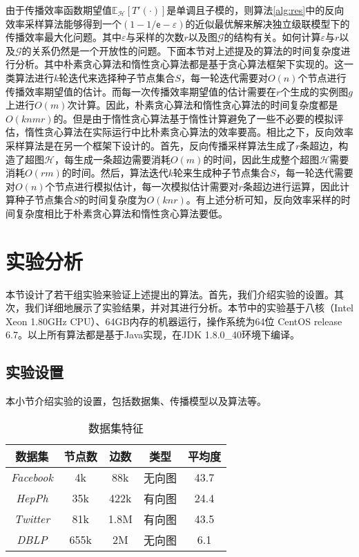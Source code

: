 由于传播效率函数期望值$\mathbb{E}_\mathcal{H}\left[T'\left(\cdot\right)\right]$是单调且子模的，则算法\ref{alg:res}中的反向效率采样算法能够得到一个$\left(1-1/\mathsf{e}-\varepsilon\right)$的近似最优解来解决独立级联模型下的传播效率最大化问题。其中$\varepsilon$与采样的次数$r$以及图$\mathcal{G}$的结构有关。如何计算$\varepsilon$与$r$以及$\mathcal{G}$的关系仍然是一个开放性的问题。下面本节对上述提及的算法的时间复杂度进行分析。其中朴素贪心算法和惰性贪心算法都是基于贪心算法框架下实现的。这一类算法进行$k$轮迭代来选择种子节点集合$S$，每一轮迭代需要对$O\left(n\right)$个节点进行传播效率期望值的估计。而每一次传播效率期望值的估计需要在$r$个生成的实例图$g$上进行$O\left(m\right)$次计算。因此，朴素贪心算法和惰性贪心算法的时间复杂度都是$O\left(knmr\right)$的。但是由于惰性贪心算法基于惰性计算避免了一些不必要的模拟评估，惰性贪心算法在实际运行中比朴素贪心算法的效率要高。相比之下，反向效率采样算法是在另一个框架下设计的。首先，反向传播采样算法生成了$r$条超边，构造了超图$\mathcal{H}$，每生成一条超边需要消耗$O\left(m\right)$的时间，因此生成整个超图$\mathcal{H}$需要消耗$O\left(rm\right)$的时间。然后，算法迭代$k$轮来生成种子节点集合$S$，每一轮迭代需要对$O\left(n\right)$个节点进行模拟估计，每一次模拟估计需要对$r$条超边进行运算，因此计算种子节点集合$S$的时间复杂度为$O\left(knr\right)$。有上述分析可知，反向效率采样的时间复杂度相比于朴素贪心算法和惰性贪心算法要低。

\section{实验分析}
\label{sec4:experiment}
本节设计了若干组实验来验证上述提出的算法。首先，我们介绍实验的设置。其次，我们详细地展示了实验结果，并对其进行分析。本节中的实验基于八核（Intel Xeon 1.80GHz CPU）、64GB内存的机器运行，操作系统为64位 CentOS release 6.7。以上所有算法都是基于Java实现，在JDK 1.8.0\_40环境下编译。
\subsection{实验设置}
\label{subsec4:settings}
本小节介绍实验的设置，包括数据集、传播模型以及算法等。
\begin{table}[!ht]
\centering
\caption{数据集特征}
\label{tab:dataset}
\begin{tabular}{ |c|c|c|c|c| }
\hline
\textbf{数据集} & \textbf{节点数} & \textbf{边数} & \textbf{类型} & \textbf{平均度} \\
\hline
\textit{Facebook} & 4k & 88k & 无向图 & 43.7\\
\hline
\textit{HepPh} & 35k & 422k & 有向图 & 24.4\\
\hline
\textit{Twitter} & 81k & 1.8M & 有向图 & 43.5\\
\hline
\textit{DBLP} & 655k & 2M & 无向图 & 6.1\\
\hline
\end{tabular}
\end{table}

